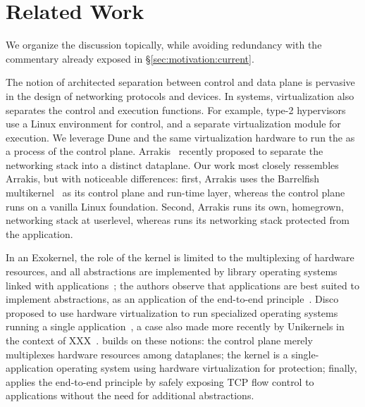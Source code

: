 

\section{Related Work}
\label{sec:related}

We organize the discussion topically, while avoiding redundancy with
the commentary already exposed in \S\ref{sec:motivation:current}.


 The notion of
architected separation between control and data plane is pervasive in
the design of networking protocols and devices.  In systems,
virtualization also separates the control and execution functions. For
example, type-2
hypervisors~\cite{DBLP:journals/tocs/BugnionDRSW12,misc/kivity07kvm}
use a Linux environment for control, and a separate virtualization
module for execution.  We leverage Dune and the same virtualization
hardware to run the \ix as a process of the control plane.
Arrakis~\cite{peter2013arrakis,arrakisTR13} recently proposed to
separate the networking stack into a distinct dataplane.  Our work
most closely ressembles Arrakis, but with noticeable differences:
first, Arrakis uses the Barrelfish multikernel~\cite{DBLP:conf/sosp/BaumannBDHIPRSS09} as its control plane
and run-time layer, whereas the \ix control plane runs on a vanilla
Linux foundation.  Second, Arrakis runs its own, homegrown, networking
stack at userlevel, whereas \ix runs its networking stack
protected from the application.

In an Exokernel, the role of the kernel is limited to the
multiplexing of hardware resources, and all abstractions are
implemented by library operating systems linked with
applications~\cite{DBLP:conf/sosp/EnglerKO95}; the authors observe
that applications are best suited to implement abstractions, as an
application of the end-to-end
principle~\cite{DBLP:journals/tocs/SaltzerRC84}.  Disco proposed to
use hardware virtualization to run specialized operating systems
running a single application~\cite{DBLP:journals/tocs/BugnionDGR97}, a
case also made more recently by Unikernels in the context of
XXX~\cite{DBLP:conf/asplos/MadhavapeddyMRSSGSHC13}.  \ix builds on
these notions: the control plane merely multiplexes hardware resources
among dataplanes; the \ix kernel is a single-application operating
system using hardware virtualization for protection; finally, \ix
applies the end-to-end principle by safely exposing TCP flow control
to applications without the need for additional abstractions.


